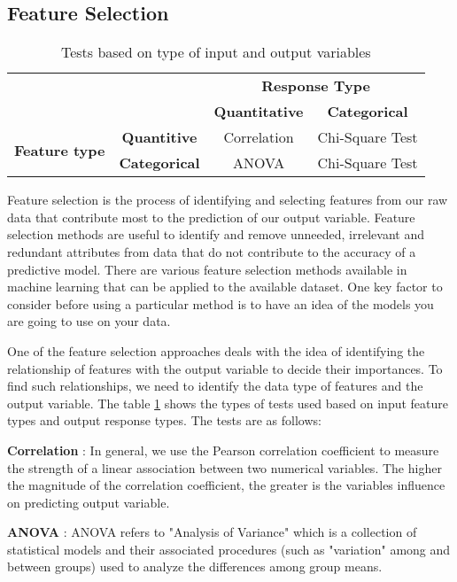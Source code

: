 \documentclass[11pt,openright]{report}
\begin{document}
\subsection {Feature Selection}
\begin{table}
	\renewcommand{\arraystretch}{1.3}
	\caption{Tests based on type of input and output variables}
	\label{table:statistical_db}
	\centering
	\begin{tabular}{|c|c|c|c|}
    \hline
    \multicolumn{2}{|c|}{} & \multicolumn{2}{|c|}{ \bfseries Response Type}\\ \cline{3-4}
      \multicolumn{2}{|c|}{} & \bfseries Quantitative & \bfseries Categorical\\ \hline
     \multirow{2}{*}{ \bfseries Feature type}   &  \bfseries Quantitive & Correlation & Chi-Square Test \\ \cline{2-4}
     & \bfseries Categorical & ANOVA & Chi-Square Test\\
    \hline

\end{tabular}
\end{table}
Feature selection is the process of identifying and selecting features from our raw data that contribute most to the prediction of our output variable. Feature selection methods are useful to identify and remove unneeded, irrelevant and redundant attributes from data that do not contribute to the accuracy of a predictive model. There are various feature selection methods available in machine learning that can be applied to the available dataset. One key factor to consider before using a particular method is to have an idea of the models you are going to use on your data. 

One of the feature selection approaches deals with the idea of identifying the relationship of features with the output variable to decide their importances. To find such relationships, we need to identify the data type of features and the output variable. The table \ref{table:statistical_db} shows the types of tests used based on input feature types and output response types. The tests are as follows: 

\noindent \textbf{Correlation} : In general, we use the Pearson correlation coefficient to measure the strength of a linear association between two numerical variables. The higher the magnitude of the correlation coefficient, the greater is the variables influence on predicting output variable.

\noindent \textbf{ANOVA} : ANOVA refers to "Analysis of Variance" which is a collection of statistical models and their associated procedures (such as "variation" among and between groups) used to analyze the differences among group means.
\end{document}
